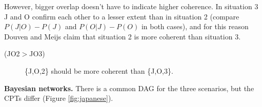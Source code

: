 \documentclass[
  10pt,
]{scrartcl}
\newcommand{\s}[1]{\textsf{#1}}
\begin{document}
However, bigger overlap doesn't have to indicate higher coherence. In situation 3 \s{J} and \s{O} confirm each other to a lesser extent than in situation 2 (compare \(P(J|O)-P(J)\) and \(P(O|J)-P(O)\) in both cases), and for this reason Douven and Meijs claim that situation 2 is more coherent than situation 3.
\vspace{2mm}

\begin{description}
    \item[(\s{JO2}$>$\s{JO3})]  \{\s{J,O,2}\} should be more coherent than \{\s{J,O,3}\}.
\end{description}\vspace{2mm}

\textbf{Bayesian networks.} There is a common DAG for the three scenarios, but the CPTs differ (Figure \ref{fig:japanese}).
\end{document}
